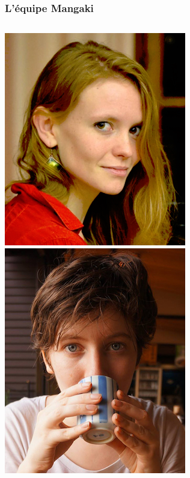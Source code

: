 \documentclass[handout]{beamer}
\begin{document}
\begin{frame}
	\frametitle{L'équipe Mangaki}
	\begin{columns}
	\begin{column}{0.2\textwidth}
	\includegraphics[width=\linewidth]{figures/camille.jpg}\\[-1mm]
	\includegraphics[width=\linewidth]{figures/solene.jpg}\\[-1mm]

\end{column}
\end{columns}
\end{frame}
\end{document}
